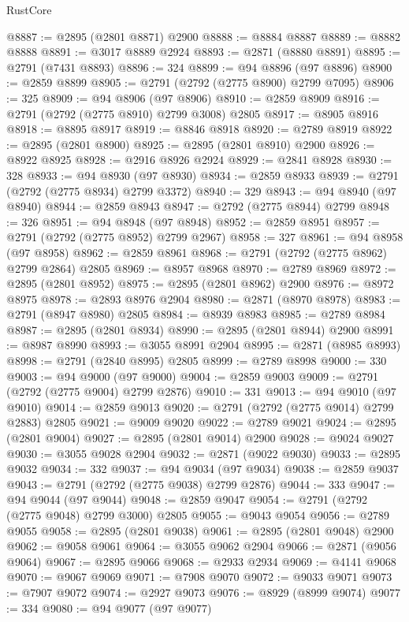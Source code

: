 \begin{lexlean}{RustCore}
\begin{coremodule}
@8887 := @2895 (@2801 @8871) @2900
@8888 := @8884 @8887
@8889 := @8882 @8888
@8891 := @3017 @8889 @2924
@8893 := @2871 (@8880 @8891)
@8895 := @2791 (@7431 @8893)
@8896 := 324
@8899 := @94 @8896 (@97 @8896)
@8900 := @2859 @8899
@8905 := @2791 (@2792 (@2775 @8900) @2799 @7095)
@8906 := 325
@8909 := @94 @8906 (@97 @8906)
@8910 := @2859 @8909
@8916 := @2791 (@2792 (@2775 @8910) @2799 @3008) @2805
@8917 := @8905 @8916
@8918 := @8895 @8917
@8919 := @8846 @8918
@8920 := @2789 @8919
@8922 := @2895 (@2801 @8900)
@8925 := @2895 (@2801 @8910) @2900
@8926 := @8922 @8925
@8928 := @2916 @8926 @2924
@8929 := @2841 @8928
@8930 := 328
@8933 := @94 @8930 (@97 @8930)
@8934 := @2859 @8933
@8939 := @2791 (@2792 (@2775 @8934) @2799 @3372)
@8940 := 329
@8943 := @94 @8940 (@97 @8940)
@8944 := @2859 @8943
@8947 := @2792 (@2775 @8944) @2799
@8948 := 326
@8951 := @94 @8948 (@97 @8948)
@8952 := @2859 @8951
@8957 := @2791 (@2792 (@2775 @8952) @2799 @2967)
@8958 := 327
@8961 := @94 @8958 (@97 @8958)
@8962 := @2859 @8961
@8968 := @2791 (@2792 (@2775 @8962) @2799 @2864) @2805
@8969 := @8957 @8968
@8970 := @2789 @8969
@8972 := @2895 (@2801 @8952)
@8975 := @2895 (@2801 @8962) @2900
@8976 := @8972 @8975
@8978 := @2893 @8976 @2904
@8980 := @2871 (@8970 @8978)
@8983 := @2791 (@8947 @8980) @2805
@8984 := @8939 @8983
@8985 := @2789 @8984
@8987 := @2895 (@2801 @8934)
@8990 := @2895 (@2801 @8944) @2900
@8991 := @8987 @8990
@8993 := @3055 @8991 @2904
@8995 := @2871 (@8985 @8993)
@8998 := @2791 (@2840 @8995) @2805
@8999 := @2789 @8998
@9000 := 330
@9003 := @94 @9000 (@97 @9000)
@9004 := @2859 @9003
@9009 := @2791 (@2792 (@2775 @9004) @2799 @2876)
@9010 := 331
@9013 := @94 @9010 (@97 @9010)
@9014 := @2859 @9013
@9020 := @2791 (@2792 (@2775 @9014) @2799 @2883) @2805
@9021 := @9009 @9020
@9022 := @2789 @9021
@9024 := @2895 (@2801 @9004)
@9027 := @2895 (@2801 @9014) @2900
@9028 := @9024 @9027
@9030 := @3055 @9028 @2904
@9032 := @2871 (@9022 @9030)
@9033 := @2895 @9032
@9034 := 332
@9037 := @94 @9034 (@97 @9034)
@9038 := @2859 @9037
@9043 := @2791 (@2792 (@2775 @9038) @2799 @2876)
@9044 := 333
@9047 := @94 @9044 (@97 @9044)
@9048 := @2859 @9047
@9054 := @2791 (@2792 (@2775 @9048) @2799 @3000) @2805
@9055 := @9043 @9054
@9056 := @2789 @9055
@9058 := @2895 (@2801 @9038)
@9061 := @2895 (@2801 @9048) @2900
@9062 := @9058 @9061
@9064 := @3055 @9062 @2904
@9066 := @2871 (@9056 @9064)
@9067 := @2895 @9066
@9068 := @2933 @2934
@9069 := @4141 @9068
@9070 := @9067 @9069
@9071 := @7908 @9070
@9072 := @9033 @9071
@9073 := @7907 @9072
@9074 := @2927 @9073
@9076 := @8929 (@8999 @9074)
@9077 := 334
@9080 := @94 @9077 (@97 @9077)

\end{coremodule}
\end{lexlean}
